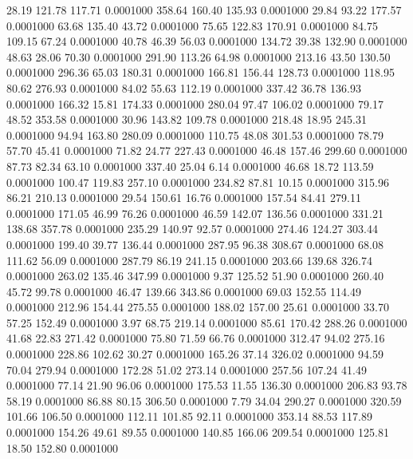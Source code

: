   28.19  121.78  117.71   0.0001000
 358.64  160.40  135.93   0.0001000
  29.84   93.22  177.57   0.0001000
  63.68  135.40   43.72   0.0001000
  75.65  122.83  170.91   0.0001000
  84.75  109.15   67.24   0.0001000
  40.78   46.39   56.03   0.0001000
 134.72   39.38  132.90   0.0001000
  48.63   28.06   70.30   0.0001000
 291.90  113.26   64.98   0.0001000
 213.16   43.50  130.50   0.0001000
 296.36   65.03  180.31   0.0001000
 166.81  156.44  128.73   0.0001000
 118.95   80.62  276.93   0.0001000
  84.02   55.63  112.19   0.0001000
 337.42   36.78  136.93   0.0001000
 166.32   15.81  174.33   0.0001000
 280.04   97.47  106.02   0.0001000
  79.17   48.52  353.58   0.0001000
  30.96  143.82  109.78   0.0001000
 218.48   18.95  245.31   0.0001000
  94.94  163.80  280.09   0.0001000
 110.75   48.08  301.53   0.0001000
  78.79   57.70   45.41   0.0001000
  71.82   24.77  227.43   0.0001000
  46.48  157.46  299.60   0.0001000
  87.73   82.34   63.10   0.0001000
 337.40   25.04    6.14   0.0001000
  46.68   18.72  113.59   0.0001000
 100.47  119.83  257.10   0.0001000
 234.82   87.81   10.15   0.0001000
 315.96   86.21  210.13   0.0001000
  29.54  150.61   16.76   0.0001000
 157.54   84.41  279.11   0.0001000
 171.05   46.99   76.26   0.0001000
  46.59  142.07  136.56   0.0001000
 331.21  138.68  357.78   0.0001000
 235.29  140.97   92.57   0.0001000
 274.46  124.27  303.44   0.0001000
 199.40   39.77  136.44   0.0001000
 287.95   96.38  308.67   0.0001000
  68.08  111.62   56.09   0.0001000
 287.79   86.19  241.15   0.0001000
 203.66  139.68  326.74   0.0001000
 263.02  135.46  347.99   0.0001000
   9.37  125.52   51.90   0.0001000
 260.40   45.72   99.78   0.0001000
  46.47  139.66  343.86   0.0001000
  69.03  152.55  114.49   0.0001000
 212.96  154.44  275.55   0.0001000
 188.02  157.00   25.61   0.0001000
  33.70   57.25  152.49   0.0001000
   3.97   68.75  219.14   0.0001000
  85.61  170.42  288.26   0.0001000
  41.68   22.83  271.42   0.0001000
  75.80   71.59   66.76   0.0001000
 312.47   94.02  275.16   0.0001000
 228.86  102.62   30.27   0.0001000
 165.26   37.14  326.02   0.0001000
  94.59   70.04  279.94   0.0001000
 172.28   51.02  273.14   0.0001000
 257.56  107.24   41.49   0.0001000
  77.14   21.90   96.06   0.0001000
 175.53   11.55  136.30   0.0001000
 206.83   93.78   58.19   0.0001000
  86.88   80.15  306.50   0.0001000
   7.79   34.04  290.27   0.0001000
 320.59  101.66  106.50   0.0001000
 112.11  101.85   92.11   0.0001000
 353.14   88.53  117.89   0.0001000
 154.26   49.61   89.55   0.0001000
 140.85  166.06  209.54   0.0001000
 125.81   18.50  152.80   0.0001000
